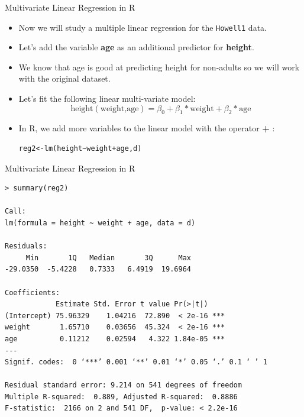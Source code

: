 \documentclass[handout]{beamer}
\begin{document}
\begin{frame}[fragile]{Multivariate Linear Regression in R}
\scriptsize{
\begin{itemize}
 \item  Now we will study a multiple linear regression for the \verb+Howell1+ data.
 \item Let's add the variable \textbf{age} as an additional predictor for \textbf{height}.
 \item We know that age is good at predicting height for non-adults so we will work with the original dataset.
 \item  Let's fit the following linear multi-variate model:
 \begin{displaymath}
 \text{height}(\text{weight,age})=\beta_{0}+\beta_{1}*\text{weight}+\beta_{2}*\text{age}
 \end{displaymath}
 \item In R, we add more variables to the linear model with the operator \textbf{+} :
\begin{verbatim}
reg2<-lm(height~weight+age,d)
\end{verbatim}



 
 \end{itemize}
 

} 
\end{frame}


\begin{frame}[fragile]{Multivariate Linear Regression in R}
\scriptsize{

\begin{verbatim}
> summary(reg2)

Call:
lm(formula = height ~ weight + age, data = d)

Residuals:
     Min       1Q   Median       3Q      Max 
-29.0350  -5.4228   0.7333   6.4919  19.6964 

Coefficients:
            Estimate Std. Error t value Pr(>|t|)    
(Intercept) 75.96329    1.04216  72.890  < 2e-16 ***
weight       1.65710    0.03656  45.324  < 2e-16 ***
age          0.11212    0.02594   4.322 1.84e-05 ***
---
Signif. codes:  0 ‘***’ 0.001 ‘**’ 0.01 ‘*’ 0.05 ‘.’ 0.1 ‘ ’ 1

Residual standard error: 9.214 on 541 degrees of freedom
Multiple R-squared:  0.889,	Adjusted R-squared:  0.8886 
F-statistic:  2166 on 2 and 541 DF,  p-value: < 2.2e-16

\end{verbatim}


 

} 
\end{frame}
\end{document}
